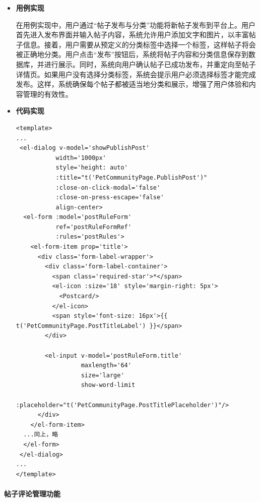 \begin{itemize}
	\item \textbf{用例实现}
	
	在用例实现中，用户通过“帖子发布与分类”功能将新帖子发布到平台上。用户首先进入发布界面并输入帖子内容，系统允许用户添加文字和图片，以丰富帖子信息。接着，用户需要从预定义的分类标签中选择一个标签，这样帖子将会被正确地分类。用户点击“发布”按钮后，系统将帖子内容和分类信息保存到数据库，并进行展示。同时，系统向用户确认帖子已成功发布，并重定向至帖子详情页。如果用户没有选择分类标签，系统会提示用户必须选择标签才能完成发布。这样，系统确保每个帖子都被适当地分类和展示，增强了用户体验和内容管理的有效性。
	
	\item \textbf{代码实现}
	\begin{verbatim}
<template>
...
 <el-dialog v-model='showPublishPost'
           width='1000px'
           style='height: auto'
           :title="t('PetCommunityPage.PublishPost')"
           :close-on-click-modal='false'
           :close-on-press-escape='false'
           align-center>
  <el-form :model='postRuleForm'
           ref='postRuleFormRef'
           :rules='postRules'>
    <el-form-item prop='title'>
      <div class='form-label-wrapper'>
        <div class='form-label-container'>
          <span class='required-star'>*</span>
          <el-icon :size='18' style='margin-right: 5px'>
            <Postcard/>
          </el-icon>
          <span style='font-size: 16px'>{{ t('PetCommunityPage.PostTitleLabel') }}</span>
        </div>
	
        <el-input v-model='postRuleForm.title'
                  maxlength='64'
                  size='large'
                  show-word-limit
                  :placeholder="t('PetCommunityPage.PostTitlePlaceholder')"/>
      </div>
    </el-form-item>
  ...同上，略
  </el-form>
 </el-dialog>
...
</template>
	\end{verbatim}
	
\end{itemize}

\paragraph{帖子评论管理功能}

